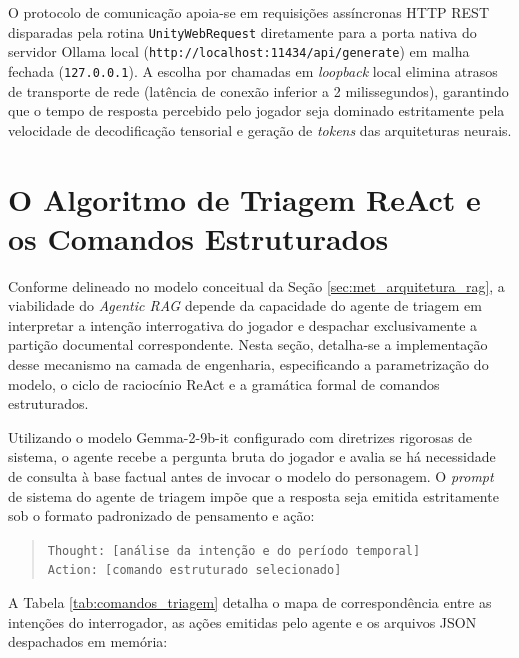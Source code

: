 O protocolo de comunicação apoia-se em requisições assíncronas HTTP REST disparadas pela rotina \texttt{UnityWebRequest} diretamente para a porta nativa do servidor Ollama local (\texttt{http://localhost:11434/api/generate}) em malha fechada (\texttt{127.0.0.1}). A escolha por chamadas em \textit{loopback} local elimina atrasos de transporte de rede (latência de conexão inferior a 2 milissegundos), garantindo que o tempo de resposta percebido pelo jogador seja dominado estritamente pela velocidade de decodificação tensorial e geração de \textit{tokens} das arquiteturas neurais.

\section{O Algoritmo de Triagem ReAct e os Comandos Estruturados}
\label{sec:dev_triagem}

Conforme delineado no modelo conceitual da Seção \ref{sec:met_arquitetura_rag}, a viabilidade do \textit{Agentic RAG} depende da capacidade do agente de triagem em interpretar a intenção interrogativa do jogador e despachar exclusivamente a partição documental correspondente. Nesta seção, detalha-se a implementação desse mecanismo na camada de engenharia, especificando a parametrização do modelo, o ciclo de raciocínio ReAct e a gramática formal de comandos estruturados.

Utilizando o modelo Gemma-2-9b-it configurado com diretrizes rigorosas de sistema, o agente recebe a pergunta bruta do jogador e avalia se há necessidade de consulta à base factual antes de invocar o modelo do personagem. O \textit{prompt} de sistema do agente de triagem impõe que a resposta seja emitida estritamente sob o formato padronizado de pensamento e ação:

\begin{quote}
\small
\texttt{Thought: [análise da intenção e do período temporal]}\\
\texttt{Action: [comando estruturado selecionado]}
\end{quote}

A Tabela \ref{tab:comandos_triagem} detalha o mapa de correspondência entre as intenções do interrogador, as ações emitidas pelo agente e os arquivos JSON despachados em memória:

